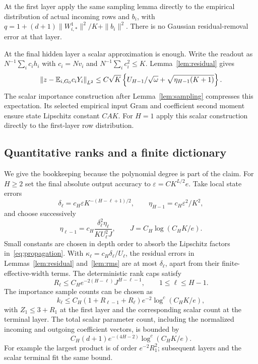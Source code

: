 At the first layer apply the same sampling lemma directly to the empirical distribution of actual incoming rows and $b_i$, with
$q=1+(d+1)\|W^1_{i,*}\|^2/K+\|b_i\|^2$.
There is no Gaussian residual-removal error at that layer.

At the final hidden layer a scalar approximation is enough. Write the readout as $N^{-1}\sum_i c_i h_i$ with $c_i=Nv_i$ and $N^{-1}\sum_i c_i^2\le K$. Lemma~\ref{lem:residual} gives
\[
 \left\|z-\mathbb E_{i,G_0}c_iY_i\right\|_{L^2}
 \le C\sqrt K\left\{U_{H-1}/\sqrt\omega+
                         \sqrt{\eta_{H-1}(K+1)}\right\}.
\]
The scalar importance construction after Lemma~\ref{lem:sampling} compresses this expectation. Its selected empirical input Gram and coefficient second moment ensure state Lipschitz constant $C A K$. For $H=1$ apply this scalar construction directly to the first-layer row distribution.

\subsection{Quantitative ranks and a finite dictionary}
We give the bookkeeping because the polynomial degree is part of the claim.
For $H\ge2$ set the final absolute output accuracy to $\varepsilon=C K^{L/2}e$.
Take local state errors
\[
 \delta_\ell=c_H\varepsilon K^{-(H-\ell+1)/2},\qquad
 \eta_{H-1}=c_H\varepsilon^2/K^2,
\]
and choose successively
\[
 \eta_{\ell-1}
 =c_H\frac{\delta_\ell^2\eta_\ell}{K U_\ell^2 J},
 \qquad J=C_H\log(C_HK/e).
\]
Small constants are chosen in depth order to absorb the Lipschitz factors in~\eqref{eq:propagation}. With $\kappa_\ell=c_H\delta_\ell/U_\ell$, the residual errors in Lemmas~\ref{lem:residual} and~\ref{lem:rms} are at most $\delta_\ell$, apart from their finite-effective-width terms.
The deterministic rank caps satisfy
\begin{equation}
 R_\ell\le C_H e^{-2(H-\ell)}J^{H-\ell-1},
                  \qquad 1\le\ell\le H-1.
 \label{eq:rankcaps}
\end{equation}
The importance sample counts can be chosen as
\[
 k_\ell\le C_H(1+R_{\ell-1}+R_\ell)e^{-2}\log^c(C_HK/e),
\]
with $Z_1\le3+R_1$ at the first layer and the corresponding scalar count at the terminal layer. The total scalar parameter count, including the normalized incoming and outgoing coefficient vectors, is bounded by
\begin{equation}
 C_H(d+1)e^{-(4H-2)}\log^c(C_HK/e).
 \label{eq:paramcount}
\end{equation}
For example the largest product is of order $e^{-2}R_1^2$; subsequent layers and the scalar terminal fit the same bound.

